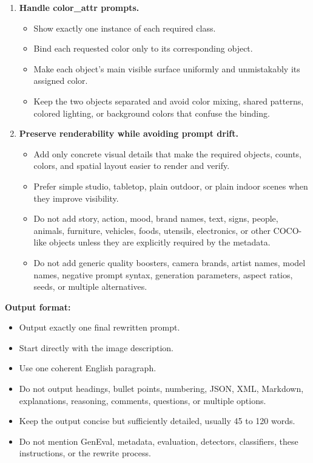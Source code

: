 \documentclass{llmxive}
\begin{document}
\begin{tcolorbox}
\begin{enumerate}[leftmargin=1.5em, itemsep=0.2em]
    \item \textbf{Handle color\_attr prompts.}
    \begin{itemize}[leftmargin=1.5em, nosep]
        \item Show exactly one instance of each required class.
        \item Bind each requested color only to its corresponding object.
        \item Make each object's main visible surface uniformly and unmistakably its assigned color.
        \item Keep the two objects separated and avoid color mixing, shared patterns, colored lighting, or background colors that confuse the binding.
    \end{itemize}

    \item \textbf{Preserve renderability while avoiding prompt drift.}
    \begin{itemize}[leftmargin=1.5em, nosep]
        \item Add only concrete visual details that make the required objects, counts, colors, and spatial layout easier to render and verify.
        \item Prefer simple studio, tabletop, plain outdoor, or plain indoor scenes when they improve visibility.
        \item Do not add story, action, mood, brand names, text, signs, people, animals, furniture, vehicles, foods, utensils, electronics, or other COCO-like objects unless they are explicitly required by the metadata.
        \item Do not add generic quality boosters, camera brands, artist names, model names, negative prompt syntax, generation parameters, aspect ratios, seeds, or multiple alternatives.
    \end{itemize}
\end{enumerate}

\medskip
\textbf{Output format:}
\begin{itemize}[leftmargin=1.5em, nosep]
    \item Output exactly one final rewritten prompt.
    \item Start directly with the image description.
    \item Use one coherent English paragraph.
    \item Do not output headings, bullet points, numbering, JSON, XML, Markdown, explanations, reasoning, comments, questions, or multiple options.
    \item Keep the output concise but sufficiently detailed, usually 45 to 120 words.
    \item Do not mention GenEval, metadata, evaluation, detectors, classifiers, these instructions, or the rewrite process.
\end{itemize}
\end{tcolorbox}
\end{document}
